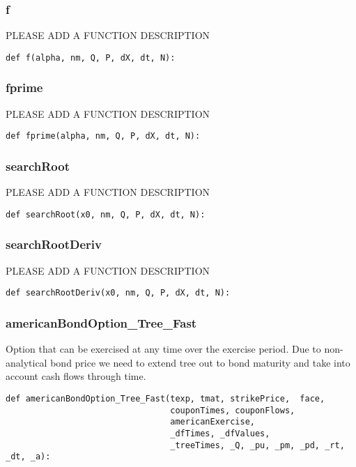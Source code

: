\documentclass[twoside,11pt]{book}
\begin{document}
\subsubsection*{{\bf f}}
PLEASE ADD A FUNCTION DESCRIPTION

\begin{lstlisting}
def f(alpha, nm, Q, P, dX, dt, N):
\end{lstlisting}

\subsubsection*{{\bf fprime}}
PLEASE ADD A FUNCTION DESCRIPTION

\begin{lstlisting}
def fprime(alpha, nm, Q, P, dX, dt, N):
\end{lstlisting}

\subsubsection*{{\bf searchRoot}}
PLEASE ADD A FUNCTION DESCRIPTION

\begin{lstlisting}
def searchRoot(x0, nm, Q, P, dX, dt, N):
\end{lstlisting}

\subsubsection*{{\bf searchRootDeriv}}
PLEASE ADD A FUNCTION DESCRIPTION

\begin{lstlisting}
def searchRootDeriv(x0, nm, Q, P, dX, dt, N):
\end{lstlisting}

\subsubsection*{{\bf americanBondOption\_Tree\_Fast}}
Option that can be exercised at any time over the exercise period. Due to non-analytical bond price we need to extend tree out to bond maturity and take into account cash flows through time.  

\begin{lstlisting}
def americanBondOption_Tree_Fast(texp, tmat, strikePrice,  face,
                                 couponTimes, couponFlows,
                                 americanExercise,
                                 _dfTimes, _dfValues,
                                 _treeTimes, _Q, _pu, _pm, _pd, _rt, _dt, _a):
\end{lstlisting}
\end{document}
